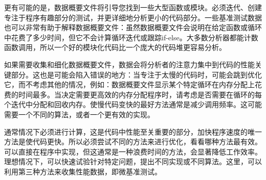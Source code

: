 更有可能的是，数据概要文件将引导您找到一些大型函数或模块。必须迭代、创建专注于程序有趣部分的测试，并更详细地分析更小的代码部分。一些基准测试数据也可以非常有助于解释数据概要文件：虽然数据概要文件会说明在给定函数或循环中花费了多少时间，但它不会计算循环迭代或跟踪if-else。大多数分析器都能计数函数调用，所以一个好的模块化代码比一个庞大的代码堆更容易分析。

如果需要收集和细化数据概要文件，数据会将分析者的注意力集中到代码的性能关键部分。这也是可能会陷入错误的地方：当专注于太慢的代码时，可能会跳到优化它，而不考虑其他的情况，例如：数据概要文件显示某个特定循环在内存分配上花费的时间最多。当决定需要更高效的内存分配程序时，请考虑是否需要在循环的每个迭代中分配和回收内存。使慢代码变快的最好方法通常是减少调用频率。这可能需要一个不同的算法，或者一个更有效的实现。

通常情况下必须进行计算，这是代码中性能至关重要的部分，加快程序速度的唯一方法是使代码更快。所以必须尝试不同的方法来进行优化，看看哪种方法最有效。可以直接在程序中实现，但这通常是一种浪费时间的方法，会显著降低工作效率。理想情况下，可以快速试验针对特定问题，提出不同实现或不同算法。这里，可以利用第三种方法来收集性能数据，即微基准测试。













